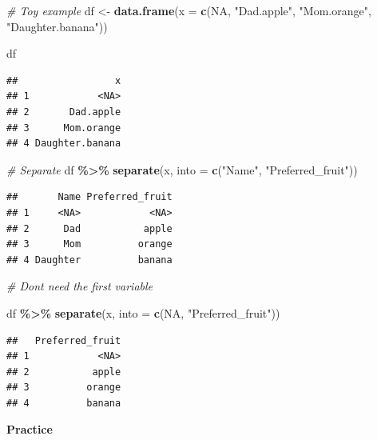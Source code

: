 \documentclass[
]{book}
\newenvironment{Shaded}{\begin{snugshade}}{\end{snugshade}}
\newcommand{\AttributeTok}[1]{\textcolor[rgb]{0.13,0.29,0.53}{#1}}
\newcommand{\CommentTok}[1]{\textcolor[rgb]{0.56,0.35,0.01}{\textit{#1}}}
\newcommand{\ConstantTok}[1]{\textcolor[rgb]{0.56,0.35,0.01}{#1}}
\newcommand{\FunctionTok}[1]{\textcolor[rgb]{0.13,0.29,0.53}{\textbf{#1}}}
\newcommand{\NormalTok}[1]{#1}
\newcommand{\OtherTok}[1]{\textcolor[rgb]{0.56,0.35,0.01}{#1}}
\newcommand{\SpecialCharTok}[1]{\textcolor[rgb]{0.81,0.36,0.00}{\textbf{#1}}}
\newcommand{\StringTok}[1]{\textcolor[rgb]{0.31,0.60,0.02}{#1}}
\begin{document}
\begin{Shaded}
\begin{Highlighting}[]
\CommentTok{\# Toy example}
\NormalTok{df }\OtherTok{\textless{}{-}} \FunctionTok{data.frame}\NormalTok{(}\AttributeTok{x =} \FunctionTok{c}\NormalTok{(}\ConstantTok{NA}\NormalTok{, }\StringTok{"Dad.apple"}\NormalTok{, }\StringTok{"Mom.orange"}\NormalTok{, }\StringTok{"Daughter.banana"}\NormalTok{))}

\NormalTok{df}
\end{Highlighting}
\end{Shaded}

\begin{verbatim}
##                 x
## 1            <NA>
## 2       Dad.apple
## 3      Mom.orange
## 4 Daughter.banana
\end{verbatim}

\begin{Shaded}
\begin{Highlighting}[]
\CommentTok{\# Separate}
\NormalTok{df }\SpecialCharTok{\%\textgreater{}\%}
  \FunctionTok{separate}\NormalTok{(x, }\AttributeTok{into =} \FunctionTok{c}\NormalTok{(}\StringTok{"Name"}\NormalTok{, }\StringTok{"Preferred\_fruit"}\NormalTok{))}
\end{Highlighting}
\end{Shaded}

\begin{verbatim}
##       Name Preferred_fruit
## 1     <NA>            <NA>
## 2      Dad           apple
## 3      Mom          orange
## 4 Daughter          banana
\end{verbatim}

\begin{Shaded}
\begin{Highlighting}[]
\CommentTok{\# Don\textquotesingle{}t need the first variable}

\NormalTok{df }\SpecialCharTok{\%\textgreater{}\%}
  \FunctionTok{separate}\NormalTok{(x, }\AttributeTok{into =} \FunctionTok{c}\NormalTok{(}\ConstantTok{NA}\NormalTok{, }\StringTok{"Preferred\_fruit"}\NormalTok{))}
\end{Highlighting}
\end{Shaded}

\begin{verbatim}
##   Preferred_fruit
## 1            <NA>
## 2           apple
## 3          orange
## 4          banana
\end{verbatim}

\textbf{Practice}
\end{document}

